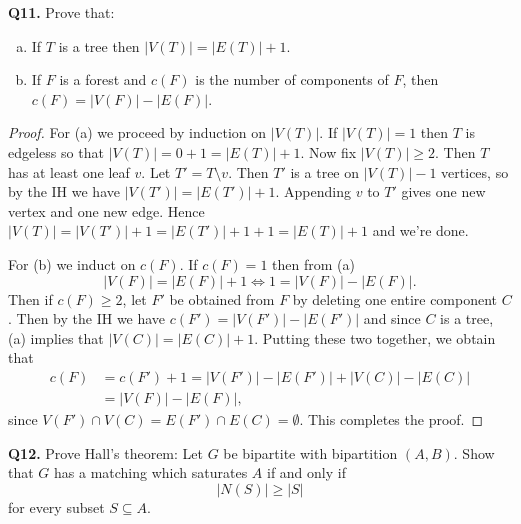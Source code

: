 \noindent \textbf{Q11.} Prove that:
\begin{enumerate}[(a)]
	\item If \( T \) is a tree then \( |V(T)| = |E(T)| + 1 \).
	\item If \( F \) is a forest and \( c(F) \) is the number of components of \( F \), then \( c(F) = |V(F)| - |E(F)| \).
\end{enumerate}
\begin{proof}
For (a) we proceed by induction on \( |V(T)| \). If \( |V(T)| = 1 \) then \( T \) is edgeless so that \( |V(T)| = 0 + 1 = |E(T)| + 1 \). Now fix \( |V(T)| \geq 2 \).  Then \( T \) has at least one leaf \( v \). Let \( T' = T \setminus v \). Then \( T' \) is a tree on \( |V(T)| - 1 \) vertices, so by the IH we have \( |V(T')| = |E(T')| + 1 \). Appending \( v \) to \( T' \) gives one new vertex and one new edge. Hence \( |V(T)| = |V(T')| + 1 = |E(T')| + 1 + 1 = |E(T)| + 1 \) and we're done.

For (b) we induct on \( c(F) \). If \( c(F) = 1 \) then from (a) \[|V(F)| = |E(F)| + 1 \Leftrightarrow   1 = |V(F)| - |E(F)|. \] Then if \( c(F) \geq 2 \), let \( F' \) be obtained from \( F \) by deleting one entire component \( C \). Then by the IH we have \( c(F') = |V(F')| - |E(F')| \) and since \( C \) is a tree, (a) implies that \( |V(C)| = |E(C)| + 1  \). Putting these two together, we obtain that
\begin{align*}
	c(F) &= c(F') + 1 = |V(F')| - |E(F')| + |V(C)| - |E(C)| \\
	     &= |V(F)| - |E(F)|, 
\end{align*}
since \( V(F') \cap V(C) = E(F') \cap E(C) = \emptyset  \). This completes the proof. 
\end{proof}
\noindent \textbf{Q12.} Prove Hall's theorem: Let \( G \) be bipartite with bipartition \( (A,B) \). Show that \( G \) has a matching which saturates \( A \) if and only if \[ |N(S)| \geq |S| \] for every subset \( S \subseteq A \).
